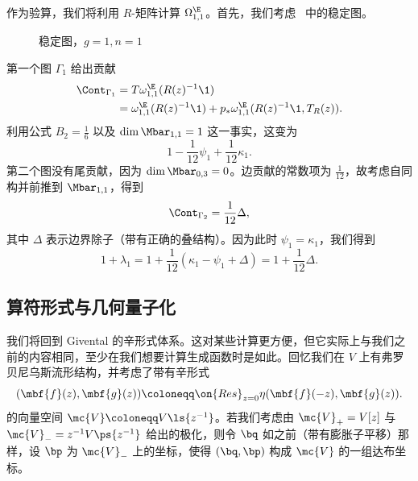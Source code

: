 \begin{exm}
    作为验算，我们将利用 $R$-矩阵计算 $\Omega_{1,1}^{\E}$。首先，我们考虑~ 中的稳定图。
    \begin{figure}[htpb]
    \begin{center}
    \end{center}
    \caption{稳定图，$g=1, n=1$}%
    \label{fig:03graphloop}
    \end{figure}
    第一个图 $\Gamma_1$ 给出贡献
    \begin{align*}
        \Cont_{\Gamma_1} &= T\omega_{1,1}^{\E}(R(z)^{-1}\1) \\
        &= \omega_{1,1}^{\E}(R(z)^{-1}\1) + p_* \omega_{1,1}^{\E}(R(z)^{-1}\1, T_R(z)).
    \end{align*}
    利用公式 $B_2 = \frac{1}{6}$ 以及 $\dim \Mbar_{1,1} = 1$ 这一事实，这变为
    \[ 1 - \frac{1}{12}\psi_1 + \frac{1}{12} \kappa_1. \]
    第二个图没有尾贡献，因为 $\dim \Mbar_{0,3} = 0$。边贡献的常数项为 $\frac{1}{12}$，故考虑自同构并前推到 $\Mbar_{1,1}$，得到
    \[ \Cont_{\Gamma_2} = \frac{1}{12} \Delta, \]
    其中 $\Delta$ 表示边界除子（带有正确的叠结构）。因为此时 $\psi_1 = \kappa_1$，我们得到
    \[ 1+\lambda_1 = 1 + \frac{1}{12}(\kappa_1 - \psi_1 + \Delta) = 1 + \frac{1}{12} \Delta. \]
\end{exm}




\subsection{算符形式与几何量子化}%
\label{sub:Operator formalism and geometric quantization}

我们将回到 Givental 的辛形式体系。这对某些计算更方便，但它实际上与我们之前的内容相同，至少在我们想要计算生成函数时是如此。回忆我们在 $V$ 上有弗罗贝尼乌斯流形结构，并考虑了带有辛形式
\[ (\mbf{f}(z), \mbf{g}(z)) \coloneqq \on{Res}_{z=0} \eta(\mbf{f}(-z), \mbf{g}(z)). \]
的向量空间 $\mc{V}\coloneqq V\ls{z^{-1}}$。若我们考虑由 $\mc{V}_+ = V[z]$ 与 $\mc{V}_- = z^{-1}V\ps{z^{-1}}$ 给出的极化，则令 $\bq$ 如之前（带有膨胀子平移）那样，设 $\bp$ 为 $\mc{V}_-$ 上的坐标，使得 $(\bq, \bp)$ 构成 $\mc{V}$ 的一组达布坐标。

